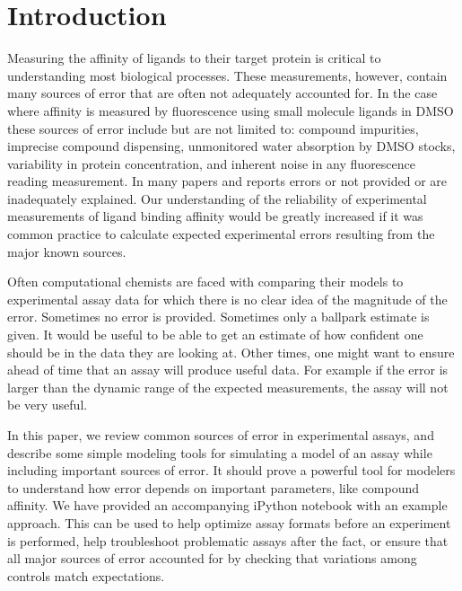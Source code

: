 \documentclass[aps,pre,twocolumn,nofootinbib,superscriptaddress,linenumbers]{revtex4-1}
\begin{document}
\section{Introduction}
\label{section:introduction}

Measuring the affinity of ligands to their target protein is critical to understanding most biological processes. These measurements, however, contain many sources of error that are often not adequately accounted for. In the case where affinity is measured by fluorescence using small molecule ligands in DMSO these sources of error include but are not limited to: compound impurities, imprecise compound dispensing, unmonitored water absorption by DMSO stocks, variability in protein concentration, and inherent noise in any fluorescence reading measurement. In many papers and reports errors or not provided or are inadequately explained. Our understanding of the reliability of experimental measurements of ligand binding affinity would be greatly increased if it was common practice to calculate expected experimental errors resulting from the major known sources.

Often computational chemists are faced with comparing their models to experimental assay data for which there is no clear idea of the magnitude of the error. Sometimes no error is provided. Sometimes only a ballpark estimate is given. It would be useful to be able to get an estimate of how confident one should be in the data they are looking at. Other times, one might want to ensure ahead of time that an assay will produce useful data. For example if the error is larger than the dynamic range of the expected measurements, the assay will not be very useful.

In this paper, we review common sources of error in experimental assays, and describe some simple modeling tools for simulating a model of an assay while including important sources of error. It should prove a powerful tool for modelers to understand how error depends on important parameters, like compound affinity. We have provided an accompanying iPython notebook with an example
approach. This can be used to help optimize assay formats before an experiment is performed, help troubleshoot problematic assays after the fact, or ensure that all major sources of error accounted for by checking that variations among controls match expectations.

\end{document}
